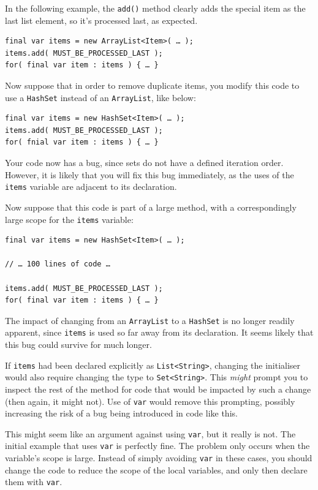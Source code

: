 \documentclass[11pt,a4paper, titlepage, parskip=half, headsepline, footsepline, cleardoublepage=current, headheight=1cm]{scrbook}
\begin{document}
\begin{enumerate}
{In the following example, the \lstinline|add()| method clearly adds the special item as the last list element, so it’s processed last, as expected.

\begin{lstlisting}
final var items = new ArrayList<Item>( … );
items.add( MUST_BE_PROCESSED_LAST );
for( final var item : items ) { … }
\end{lstlisting}

Now suppose that in order to remove duplicate items, you modify this code to use a \lstinline|HashSet| instead of an \lstinline|ArrayList|, like below:

\begin{lstlisting}
final var items = new HashSet<Item>( … );
items.add( MUST_BE_PROCESSED_LAST );
for( fnial var item : items ) { … }
\end{lstlisting}

Your code now has a bug, since sets do not have a defined iteration order. However, it is likely that you will fix this bug immediately, as the uses of the \lstinline|items| variable are adjacent to its declaration.

Now suppose that this code is part of a large method, with a correspondingly large scope for the \lstinline|items| variable:

\begin{lstlisting}
final var items = new HashSet<Item>( … );

// … 100 lines of code …

items.add( MUST_BE_PROCESSED_LAST );
for( final var item : items ) { … }
\end{lstlisting}

The impact of changing from an \lstinline|ArrayList| to a \lstinline|HashSet| is no longer readily apparent, since \lstinline|items| is used so far away from its declaration. It seems likely that this bug could survive for much longer.

If \lstinline|items| had been declared explicitly as \lstinline|List<String>|, changing the initialiser would also require changing the type to \lstinline|Set<String>|. This \textit{might} prompt you to inspect the rest of the method for code that would be impacted by such a change (then again, it might not). Use of \lstinline|var| would remove this prompting, possibly increasing the risk of a bug being introduced in code like this.

This might seem like an argument against using \lstinline|var|, but it really is not. The initial example that uses \lstinline|var| is perfectly fine. The problem only occurs when the variable's scope is large. Instead of simply avoiding \lstinline|var| in these cases, you should change the code to reduce the scope of the local variables, and only then declare them with \lstinline|var|.}


\end{enumerate}
\end{document}
